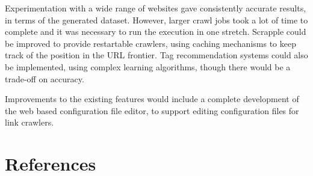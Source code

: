 \documentclass[letterpaper,12pt,english]{sphinxmanual}
\begin{document}
Experimentation with a wide range of websites gave consistently accurate results, in terms of the generated dataset. However, larger crawl jobs took a lot of time to complete and it was necessary to run the execution in one stretch. Scrapple could be improved to provide restartable crawlers, using caching mechanisms to keep track of the position in the URL frontier. Tag recommendation systems could also be implemented, using complex learning algorithms, though there would be a trade-off on accuracy.

Improvements to the existing features would include a complete development of the web based configuration file editor, to support editing configuration files for link crawlers.


\chapter{References}
\end{document}
